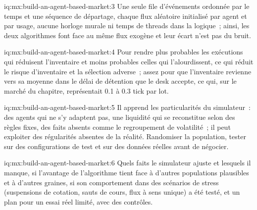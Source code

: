 \begin{solution}{iq:mx:build-an-agent-based-market:3}
Une seule file d'événements ordonnée par le temps et une séquence de départage, chaque flux aléatoire initialisé par agent et par usage, aucune horloge murale ni temps de threads dans
la logique~; ainsi, les deux algorithmes font face au même flux exogène et leur écart n'est pas du bruit.
\end{solution}

\begin{solution}{iq:mx:build-an-agent-based-market:4}
Pour rendre plus probables les exécutions qui réduisent l'inventaire et moins probables celles qui l'alourdissent, ce qui réduit le risque d'inventaire et la sélection adverse~; assez pour que
l'inventaire revienne vers sa moyenne dans le délai de détention que le desk accepte, ce qui, sur le marché du chapitre, représentait 0.1 à 0.3 tick par lot.
\end{solution}

\begin{solution}{iq:mx:build-an-agent-based-market:5}
Il apprend les particularités du simulateur~: des agents qui ne s'y adaptent pas, une liquidité qui se reconstitue selon des règles fixes, des faits absents comme le regroupement de volatilité~; il peut
exploiter des régularités absentes de la réalité. Randomiser la population, tester sur des configurations de test et sur des données réelles avant de négocier.
\end{solution}

\begin{solution}{iq:mx:build-an-agent-based-market:6}
Quels faits le simulateur ajuste et lesquels il manque, si l'avantage de l'algorithme tient face à d'autres populations plausibles et à d'autres graines, si son comportement
dans des scénarios de stress (suspensions de cotation, sauts de cours, flux à sens unique) a été testé, et un plan pour un essai réel limité, avec des contrôles.
\end{solution}
